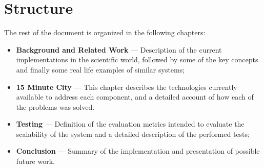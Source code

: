 \section{Structure}
\label{s:thesis_outline}

The rest of the document is organized in the following chapters:

\begin{itemize}
    \item \textbf{Background and Related Work} --- Description of the current implementations in the scientific world, followed by some of the key concepts and finally some real life examples of similar systems;
    \item \textbf{15 Minute City} --- This chapter describes the technologies currently available to address each component, and a detailed account of how each of the problems was solved. 
    \item \textbf{Testing} --- Definition of the evaluation metrics intended to evaluate the scalability of the system and a detailed description of the performed tests;
    \item \textbf{Conclusion} --- Summary of the implementation and presentation of possible future work.
\end{itemize}
